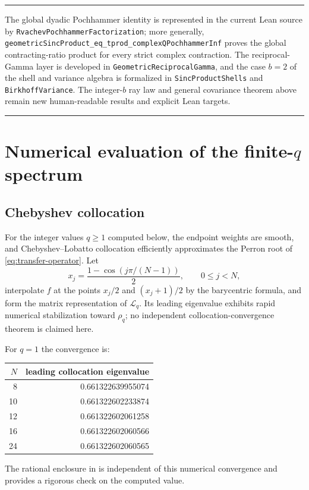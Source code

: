 \documentclass[11pt,oneside]{article}
\numberwithin{equation}{section}
\theoremstyle{definition}
\theoremstyle{remark}
\newcommand{\lean}[1]{\texttt{#1}}
\newcommand{\decl}[1]{\nolinkurl{#1}}
\newenvironment{boxedremark}{%
  \par\smallskip\noindent\begin{center}\begin{minipage}{0.94\textwidth}%
  \color{black}\hrule\vspace{0.6em}\small
}{%
  \vspace{0.6em}\hrule\end{minipage}\end{center}\smallskip
}
\begin{document}
\begin{boxedremark}
The global dyadic Pochhammer identity is represented in the current Lean source by
\lean{RvachevPochhammerFactorization}; more generally,
\decl{geometricSincProduct_eq_tprod_complexQPochhammerInf} proves the global
contracting-ratio product for every strict complex contraction.  The reciprocal-Gamma layer
is developed in \lean{GeometricReciprocalGamma}, and the case $b=2$ of the shell and
variance algebra is formalized in \lean{SincProductShells} and \lean{BirkhoffVariance}.
The integer-$b$ ray law and general covariance theorem above remain new human-readable
results and explicit Lean targets.
\end{boxedremark}

\section{Numerical evaluation of the finite-\texorpdfstring{$q$}{q} spectrum}
\label{sec:numerics}

\subsection{Chebyshev collocation}

For the integer values $q\ge1$ computed below, the endpoint weights are smooth, and
Chebyshev--Lobatto collocation efficiently approximates the Perron root of
\eqref{eq:transfer-operator}.
Let
\[
 x_j=\frac{1-\cos(j\pi/(N-1))}{2},\qquad 0\le j<N,
\]
interpolate $f$ at the points $x_j/2$ and $(x_j+1)/2$ by the barycentric formula, and form
the matrix representation of $\mathcal L_q$.  Its leading eigenvalue exhibits rapid
numerical stabilization toward $\rho_q$; no independent collocation-convergence theorem is
claimed here.

For $q=1$ the convergence is:
\begin{center}
\begin{tabular}{@{}rr@{}}
\toprule
$N$ & leading collocation eigenvalue\\
\midrule
8  & 0.661322639955074\\
10 & 0.661322602233874\\
12 & 0.661322602061258\\
16 & 0.661322602060566\\
24 & 0.661322602060565\\
\bottomrule
\end{tabular}
\end{center}
The rational enclosure in  is independent of this numerical
convergence and provides a rigorous check on the computed value.
\end{document}
